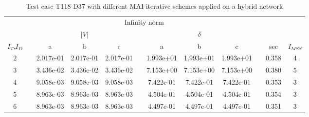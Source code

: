 \begin{table}
\renewcommand{\arraystretch}{1.3}
\centering
\label{tab:resultsPIC3P}\hspace{2cm}\caption{Test case T118-D37 with different MAI-iterative schemes applied on a hybrid network}
\begin{adjustbox}{width=1\textwidth} %
\small
\begin{tabular}{cccccccccccc}
\toprule
{} && \multicolumn{7}{c}{Infinity norm} && &  \\
\cmidrule{3-9}
{} && \multicolumn{3}{c}{$|V|$} && \multicolumn{3}{c}{$\delta$} && \\
\cmidrule{3-5}\cmidrule{7-9}
{$I_T$,$I_D$} &&        a &        b &       c &&        a &       b &        c && sec & $I_{MSS}$\\
\midrule
2 &&  2.017e-01 &  2.017e-01 &  2.017e-01 &&  1.993e+01 &  1.993e+01 &  1.993e+01 && 0.358 & 4 \\
3 &&  3.436e-02 &  3.436e-02 &  3.436e-02 &&  7.153e+00 &  7.153e+00 &  7.153e+00 && 0.380& 5\\
4 &&  9.058e-03 &  9.058e-03 &  9.058e-03 &&  7.422e-01 &  7.422e-01 &  7.422e-01 && 0.353& 3\\
5 &&  8.963e-03 &  8.963e-03 &  8.963e-03 &&  4.504e-01 &  4.504e-01 &  4.504e-01 && 0.354& 3 \\
6 &&  8.963e-03 &  8.963e-03 &  8.963e-03 &&  4.497e-01 &  4.497e-01 &  4.497e-01 && 0.351&3\\
\bottomrule
\end{tabular}
\end{adjustbox}
\end{table}
